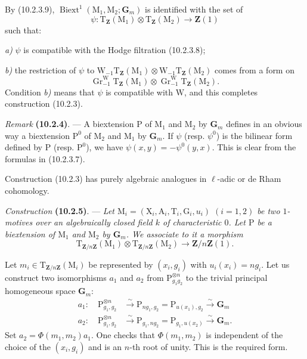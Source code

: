 \documentclass[11pt,leqno]{article}
\newcommand{\Page}[1]{\ifvmode\noindent\else\unskip\ \fi{\footnotesize\textcolor{gray}{[p.\,#1]}}\ \ignorespaces}
\begin{document}
By (10.2.3.9),
\(\operatorname{Biext}^{1}(\mathrm{M}_1,\mathrm{M}_2;\mathbf{G}_m)\)
is identified with the set of
\[
\psi:\mathrm{T}_{\mathbf{Z}}(\mathrm{M}_1)\otimes
\mathrm{T}_{\mathbf{Z}}(\mathrm{M}_2)\to\mathbf{Z}(1)
\]
such that:

\noindent\textit{a)} \(\psi\) is compatible with the Hodge
filtration (10.2.3.8);

\noindent\textit{b)} the restriction of \(\psi\) to
\(\mathrm{W}_{-1}\mathrm{T}_{\mathbf{Z}}(\mathrm{M}_1)\otimes
\mathrm{W}_{-1}\mathrm{T}_{\mathbf{Z}}(\mathrm{M}_2)\)
comes from a form on
\[
\operatorname{Gr}^{\mathrm{W}}_{-1}
\mathrm{T}_{\mathbf{Z}}(\mathrm{M}_1)\otimes
\operatorname{Gr}^{\mathrm{W}}_{-1}
\mathrm{T}_{\mathbf{Z}}(\mathrm{M}_2).
\]
Condition \textit{b)} means that \(\psi\) is compatible with
\(\mathrm{W}\), and this completes construction (10.2.3).

\textit{Remark} \textbf{(10.2.4)}. — A biextension
\(\mathrm{P}\) of \(\mathrm{M}_1\) and \(\mathrm{M}_2\) by
\(\mathbf{G}_m\) defines in an obvious way a biextension
\(\mathrm{P}^{0}\) of \(\mathrm{M}_2\) and \(\mathrm{M}_1\) by
\(\mathbf{G}_m\). If \(\psi\) (resp. \(\psi^{0}\)) is the bilinear
form
\Page{64}
defined by \(\mathrm{P}\) (resp. \(\mathrm{P}^{0}\)), we have
\(\psi(x,y)=-\psi^{0}(y,x)\). This is clear from the formulas in
(10.2.3.7).

Construction (10.2.3) has purely algebraic analogues in
\(\ell\)-adic or de Rham cohomology.

\textit{Construction} \textbf{(10.2.5)}. — \textit{Let
\(\mathrm{M}_i=(\mathrm{X}_i,\mathrm{A}_i,\mathrm{T}_i,\mathrm{G}_i,u_i)\)
\((i=1,2)\) be two \(1\)-motives over an algebraically closed
field \(k\) of characteristic \(0\). Let \(\mathrm{P}\) be a biextension
of \(\mathrm{M}_1\) and \(\mathrm{M}_2\) by \(\mathbf{G}_m\).
We associate to it a morphism}
\[
\mathrm{T}_{\mathbf{Z}/n\mathbf{Z}}(\mathrm{M}_1)\otimes
\mathrm{T}_{\mathbf{Z}/n\mathbf{Z}}(\mathrm{M}_2)
\to\mathbf{Z}/n\mathbf{Z}(1).
\]

Let  \(m_i\in\mathrm{T}_{\mathbf{Z}/n\mathbf{Z}}(\mathrm{M}_i)\)
be represented by \((x_i,g_i)\) with \(u_i(x_i)=ng_i\).
Let us construct two isomorphisms \(a_1\) and \(a_2\) from
\(\mathrm{P}_{g_1g_2}^{\otimes n}\) to the trivial principal homogeneous space
\(\mathbf{G}_m\):
\[
\begin{aligned}
a_1:\quad
\mathrm{P}_{g_1,g_2}^{\otimes n}
&\xrightarrow{\sim}\mathrm{P}_{ng_1,g_2}
=\mathrm{P}_{u(x_1),g_2}\xrightarrow{\sim}\mathbf{G}_m\\
a_2:\quad
\mathrm{P}_{g_1,g_2}^{\otimes n}
&\xrightarrow{\sim}\mathrm{P}_{g_1,ng_2}
=\mathrm{P}_{g_1,u(x_2)}\xrightarrow{\sim}\mathbf{G}_m.
\end{aligned}
\]
Set \(a_2=\Phi(m_1,m_2)a_1\). One checks that
\(\Phi(m_1,m_2)\) is independent of the choice of the \((x_i,g_i)\) and
is an \(n\)-th root of unity. This is the required form.
\end{document}
